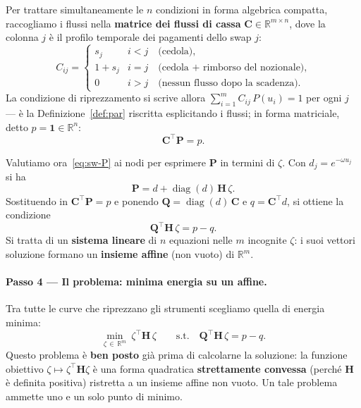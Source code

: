 \documentclass[11pt,a4paper]{article}
\theoremstyle{plain}
\theoremstyle{definition}
\theoremstyle{remark}
\newcommand{\Qmat}{\mathbf{Q}}
\newcommand{\Hmat}{\mathbf{H}}
\newcommand{\transp}{^{\!\top}}
\begin{document}
Per trattare simultaneamente le $n$ condizioni in forma algebrica compatta, raccogliamo i
flussi nella \textbf{matrice dei flussi di cassa} $\mathbf{C}\in\mathbb{R}^{m\times n}$,
dove la colonna $j$ \`e il profilo temporale dei pagamenti dello swap $j$:
\[
  C_{ij} =
  \begin{cases}
    s_j     & i < j \quad\text{(cedola),}\\
    1 + s_j & i = j \quad\text{(cedola + rimborso del nozionale),}\\
    0        & i > j \quad\text{(nessun flusso dopo la scadenza).}
  \end{cases}
\]
La condizione di riprezzamento si scrive allora $\sum_{i=1}^{m} C_{ij}\,P(u_i) = 1$ per ogni
$j$ --- \`e la Definizione~\ref{def:par} riscritta esplicitando i flussi; in forma matriciale,
detto $p = \mathbf{1} \in \mathbb{R}^n$:
\[
  \mathbf{C}\transp \mathbf{P} = p .
\]

Valutiamo ora~\eqref{eq:sw-P} ai nodi per esprimere $\mathbf{P}$ in termini di $\zeta$.
Con $d_j = e^{-\omega u_j}$ si ha
\[
  \mathbf{P} = d + \operatorname{diag}(d)\,\Hmat\,\zeta .
\]
Sostituendo in $\mathbf{C}\transp \mathbf{P} = p$ e ponendo
$\Qmat = \operatorname{diag}(d)\,\mathbf{C}$ e $q = \mathbf{C}\transp d$, si ottiene la
condizione
\[
  \Qmat\transp \Hmat\, \zeta = p - q .
\]
Si tratta di un \textbf{sistema lineare} di $n$ equazioni nelle $m$ incognite $\zeta$:
i suoi vettori soluzione formano un \textbf{insieme affine} (non vuoto) di $\mathbb{R}^m$.

\paragraph{Passo 4 --- Il problema: minima energia su un affine.}
Tra tutte le curve che riprezzano gli strumenti scegliamo quella di energia minima:
\begin{equation}
  \min_{\zeta\,\in\,\mathbb{R}^m} \ \zeta\transp \Hmat\, \zeta
  \qquad \text{s.t.}\quad
  \Qmat\transp \Hmat\, \zeta = p - q .
  \label{eq:minenergia}
\end{equation}
Questo problema \`e \textbf{ben posto} gi\`a prima di calcolarne la soluzione: la funzione
obiettivo $\zeta\mapsto\zeta\transp\Hmat\zeta$ \`e una forma quadratica
\textbf{strettamente convessa} (perch\'e $\Hmat$ \`e definita positiva) ristretta a un
insieme affine non vuoto. Un tale problema ammette uno e un solo punto di minimo.
\end{document}
